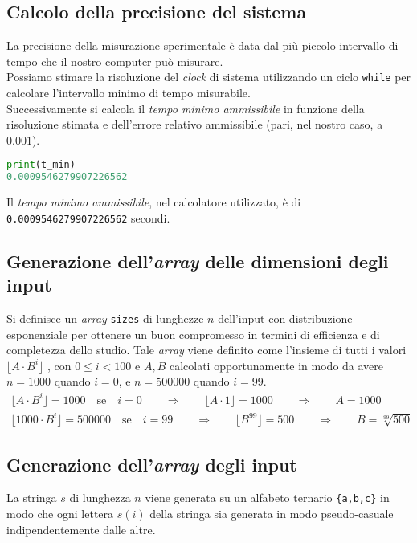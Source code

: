 \documentclass[11pt,a4paper]{article}
\begin{document}
\subsection{Calcolo della precisione del sistema}
La precisione della misurazione sperimentale è data dal più piccolo intervallo di tempo che il nostro computer può misurare.\\
Possiamo stimare la risoluzione del \textit{clock} di sistema utilizzando un ciclo \texttt{while} per calcolare l'intervallo minimo di tempo misurabile.\\
Successivamente si calcola il \textit{tempo minimo ammissibile} in funzione della risoluzione stimata e dell'errore relativo ammissibile (pari, nel nostro caso, a $0.001$).

\begin{lstlisting}[language=Python]
print(t_min)
0.0009546279907226562
\end{lstlisting}

Il \textit{tempo minimo ammissibile}, nel calcolatore utilizzato, è di \texttt{0.0009546279907226562} secondi.

\subsection{Generazione dell'\textit{array} delle dimensioni degli input}
Si definisce un \textit{array} \texttt{sizes} di lunghezze $n$ dell'input con distribuzione esponenziale per ottenere un buon compromesso in termini di efficienza e di completezza dello studio. Tale \textit{array} viene definito come l'insieme di tutti i valori  $ \bigl\lfloor A \cdot B^i \bigl\rfloor $ , con $ 0 \leq i <  100 $ e $A,B$ calcolati opportunamente in modo da avere $n=1000$ quando $i=0$, e $n=500000$ quando $i=99$.
\begin{gather*}
\bigl\lfloor A \cdot B^i \bigl\rfloor = 1000 \quad \text{se} \quad i = 0 \qquad \Rightarrow \qquad \bigl\lfloor A \cdot 1 \bigl\rfloor = 1000 \qquad \Rightarrow \qquad A = 1000\\
\bigl\lfloor 1000 \cdot B^i \bigl\rfloor = 500000 \quad \text{se} \quad i = 99 \qquad \Rightarrow \qquad \bigl\lfloor B^{99} \bigl\rfloor = 500 \qquad \Rightarrow \qquad B = \sqrt[99]{500}
\end{gather*}


\subsection{Generazione dell'\textit{array} degli input}
La stringa $s$ di lunghezza $n$ viene generata su un alfabeto ternario \texttt{\{a,b,c\}} in modo che ogni lettera $s(i)$ della stringa sia generata in modo pseudo-casuale indipendentemente dalle altre.

\end{document}
